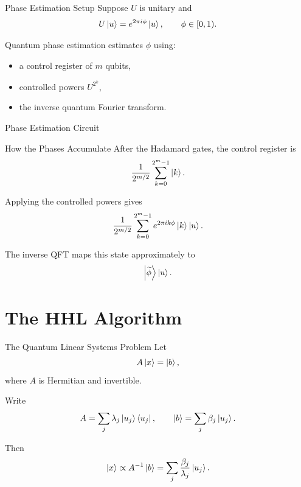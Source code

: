 \documentclass{beamer}
\begin{document}
\begin{frame}{Phase Estimation Setup}
Suppose \(U\) is unitary and
\[
U\ket{u}=e^{2\pi i \phi}\ket{u},
\qquad
\phi\in[0,1).
\]

Quantum phase estimation estimates \(\phi\) using:
\begin{itemize}
    \item a control register of \(m\) qubits,
    \item controlled powers \(U^{2^k}\),
    \item the inverse quantum Fourier transform.
\end{itemize}
\end{frame}

\begin{frame}{Phase Estimation Circuit}
\end{frame}

\begin{frame}{How the Phases Accumulate}
After the Hadamard gates, the control register is
\[
\frac{1}{2^{m/2}} \sum_{k=0}^{2^m-1} \ket{k}.
\]

Applying the controlled powers gives
\[
\frac{1}{2^{m/2}}\sum_{k=0}^{2^m-1} e^{2\pi i k\phi}\ket{k}\ket{u}.
\]

The inverse QFT maps this state approximately to
\[
\ket{\widetilde{\phi}}\ket{u}.
\]
\end{frame}

\section{The HHL Algorithm}

\begin{frame}{The Quantum Linear Systems Problem}
Let
\[
A\ket{x}=\ket{b},
\]
where \(A\) is Hermitian and invertible.

Write
\[
A=\sum_j \lambda_j \ket{u_j}\bra{u_j},
\qquad
\ket{b}=\sum_j \beta_j \ket{u_j}.
\]

Then
\[
\ket{x}\propto A^{-1}\ket{b}
=
\sum_j \frac{\beta_j}{\lambda_j}\ket{u_j}.
\]
\end{frame}
\end{document}
